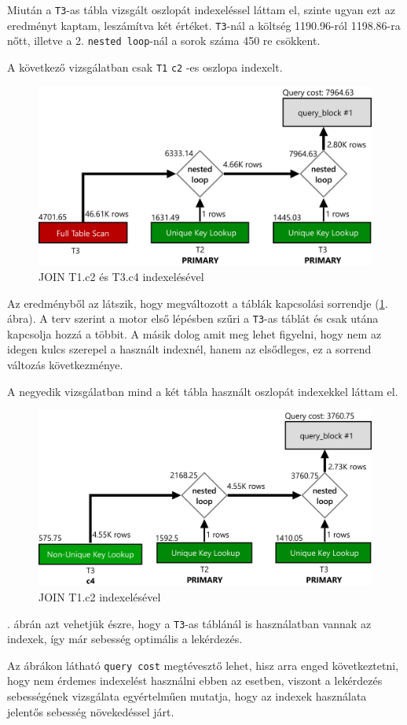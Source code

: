 Miután a \texttt{T3}-as tábla vizsgált oszlopát indexeléssel láttam el, szinte ugyan ezt az eredményt kaptam, leszámítva két értéket. \texttt{T3}-nál a költség 1190.96-ról 1198.86-ra nőtt, illetve a 2. \texttt{nested loop}-nál a sorok száma 450 re csökkent.

\newpage

A következő vizsgálatban csak \texttt{T1} \texttt{c2} -es oszlopa indexelt.

\begin{figure}[h!]
\centering
\includegraphics[width=14cm]{images/explain/3-2.png}
\caption{JOIN T1.c2 és T3.c4 indexelésével}
\label{fig:explain_3_2}
\end{figure}

Az eredményből az látszik, hogy megváltozott a táblák kapcsolási sorrendje (\ref{fig:explain_3_2}. ábra). A terv szerint a motor első lépésben szűri a \texttt{T3}-as táblát és csak utána kapcsolja hozzá a többit. A másik dolog amit meg lehet figyelni, hogy nem az idegen kulcs szerepel a használt indexnél, hanem az elsődleges, ez a sorrend változás következménye.

A negyedik vizsgálatban mind a két tábla használt oszlopát indexekkel láttam el.

\begin{figure}[h!]
\centering
\includegraphics[width=14cm]{images/explain/3-3.png}
\caption{JOIN T1.c2 indexelésével}
\label{fig:explain_3_3}
\end{figure}

. ábrán azt vehetjük észre, hogy a \texttt{T3}-as táblánál is használatban vannak az indexek, így már sebesség optimális a lekérdezés.

Az ábrákon látható \texttt{query cost} megtévesztő lehet, hisz arra enged következtetni, hogy nem érdemes indexelést használni ebben az esetben, viszont a lekérdezés sebességének vizsgálata egyértelműen mutatja, hogy az indexek használata jelentős sebesség növekedéssel járt. 
